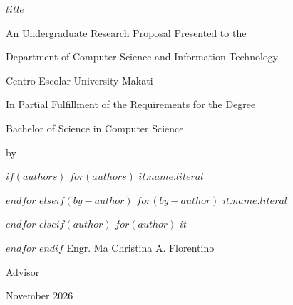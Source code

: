 \begin{titlepage}
  \setlength{\parindent}{0pt}%
  \centering
  \vspace*{0.25in}%
  {\bfseries $title$}\par
  \vfill
  An Undergraduate Research Proposal Presented to the\par
  Department of Computer Science and Information Technology\par
  Centro Escolar University Makati\par
  \vfill
  In Partial Fulfillment of the Requirements for the Degree\par
  Bachelor of Science in Computer Science\par
  \vfill
  by\par
  \vspace{0.1in}%
$if(authors)$
$for(authors)$
  $it.name.literal$\par
$endfor$
$elseif(by-author)$
$for(by-author)$
  $it.name.literal$\par
$endfor$
$elseif(author)$
$for(author)$
  $it$\par
$endfor$
$endif$
  \vfill
  Engr. Ma Christina A. Florentino\par
  Advisor\par
  \vfill
  November 2026\par
\end{titlepage}
